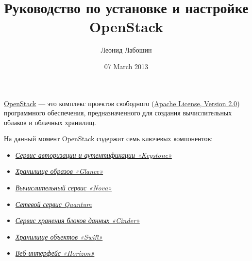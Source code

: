 \documentclass[letterpaper,10pt,russian]{sphinxmanual}
\title{Руководство по установке и настройке OpenStack}
\date{07 March 2013}
\author{Леонид Лабошин}
\begin{document}
\maketitle
\tableofcontents
{}\label{README::doc}

\label{README:contents}\begin{figure}[htbp]\begin{flushright}

\end{flushright}\end{figure}

\href{http://www.openstack.org/}{OpenStack} — это комплекс проектов свободного (\href{http://www.apache.org/licenses/LICENSE-2.0}{Apache License, Version 2.0}) программного обеспечения, предназначенного для создания вычислительных облаков и облачных хранилищ.

На данный момент OpenStack содержит семь ключевых компонентов:
\begin{itemize}
\item {} 
{\hyperref[README:keystone]{\emph{Сервис авторизации и аутентификации «Keystone»}}}

\item {} 
{\hyperref[README:glance]{\emph{Хранилище образов «Glance»}}}

\item {} 
{\hyperref[README:nova]{\emph{Вычислительный сервис «Nova»}}}

\item {} 
{\hyperref[README:quantum]{\emph{Сетевой сервис Quantum}}}

\item {} 
{\hyperref[README:cinder]{\emph{Сервис хранения блоков данных «Cinder»}}}

\item {} 
{\hyperref[README:swift]{\emph{Хранилище объектов «Swift»}}}

\item {} 
{\hyperref[README:horizon]{\emph{Веб-интерфейс «Horizon»}}}

\end{itemize}
\end{document}

